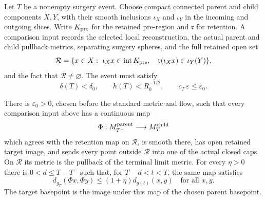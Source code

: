 Let $T$ be a nonempty surgery event.  Choose compact connected parent
and child components $X,Y$, with their smooth inclusions $\iota_X$
and $\iota_Y$ in the incoming and outgoing slices.  Write
$K_{\rm pre}$ for the retained pre-region and $\mathfrak r$ for
retention.  A comparison input records the selected local reconstruction,
the actual parent and child pullback metrics, separating surgery
spheres, and the full retained open set
\[
 \mathcal R=\{x\in X:\ \iota_X x\in\operatorname{int}K_{\rm pre},\quad
       \mathfrak r(\iota_X x)\in\iota_Y(Y)\},
\]
and the fact that $\mathcal R\ne\varnothing$.  The event must satisfy
\[
 \delta(T)<\delta_0,\qquad h(T)<R_0^{-1/2},\qquad
 c_T\,\varepsilon\leq\varepsilon_0.
\]

\begin{theorem}
\label{thm:comparison-map}
There is $\varepsilon_0>0$, chosen before the standard metric and flow, such
that every comparison input above has a continuous map
\[
                   \Phi:M_{T^-}^{\rm parent}\longrightarrow M_T^{\rm child}
\]
which agrees with the retention map on $\mathcal R$, is smooth there, has
open retained target image, and sends every point outside $\mathcal R$ into
one of the actual closed caps.  On $\mathcal R$ its metric is the pullback of
the terminal limit metric.  For every $\eta>0$ there is
$0<d\leq T-T^-$ such that,
for $T-d<t<T$, the same map satisfies
\[
 d_{g_T}(\Phi x,\Phi y)\leq (1+\eta)d_{g(t)}(x,y)
 \quad\text{for all }x,y.
\]
The target basepoint is the image under this map of the chosen parent
basepoint.
\cite[Proposition 15.12, p. 365; Claim 18.22, p. 433]{MT2007}
\end{theorem}

